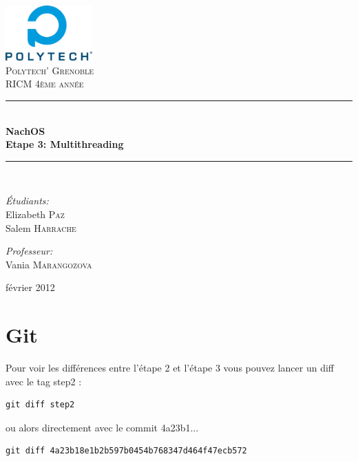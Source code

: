 \documentclass[a4paper,10pt]{article}
\newcommand{\HRule}{\rule{\linewidth}{0.5mm}}
\begin{document}
\begin{titlepage}

\begin{center}


\includegraphics[width=0.25\textwidth]{./images/logo}\\[1cm]

\textsc{\LARGE Polytech' Grenoble}\\[1.5cm]

\textsc{\Large RICM 4\`eme ann\'ee}\\[1.2cm]


\HRule \\[0.4cm]
{ \huge \bfseries NachOS\\[0.6cm]
Etape 3: Multithreading}
\\[0.4cm]

\HRule \\[2cm]

\begin{minipage}{0.4\textwidth}
\begin{flushleft} \large
\emph{\'Etudiants:}\\
Elizabeth \textsc{Paz} \\
Salem \textsc{Harrache}
\end{flushleft}
\end{minipage}
\begin{minipage}{0.4\textwidth}
\begin{flushright} \large
\emph{Professeur:} \\
Vania \textsc{Marangozova}
\end{flushright}
\end{minipage}

\vfill

{\large  février 2012}

\end{center}

\end{titlepage}

\section{Git}

Pour voir les différences entre l'étape 2 et l'étape 3 vous pouvez lancer un
diff avec le tag step2 :
\begin{lstlisting}
git diff step2
\end{lstlisting}
ou alors directement avec le commit 4a23b1...
\begin{lstlisting}
git diff 4a23b18e1b2b597b0454b768347d464f47ecb572
\end{lstlisting}
\end{document}
